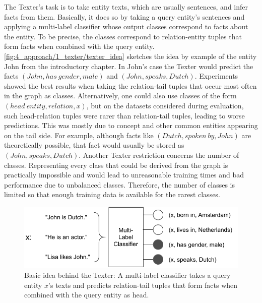 The Texter's task is to take entity texts, which are usually sentences, and infer facts from them. Basically, it does so by taking a query entity's sentences and applying a multi-label classifier whose output classes correspond to facts about the entity. To be precise, the classes correspond to relation-entity tuples that form facts when combined with the query entity. \autoref{fig:4_approach/1_texter/texter_idea} sketches the idea by example of the entity John from the introductory chapter. In John's case the Texter would predict the facts $(John, has~gender, male)$ and $(John, speaks, Dutch)$. Experiments showed the best results when taking the relation-tail tuples that occur most often in the graph as classes. Alternatively, one could also use classes of the form $(head~entity, relation, x)$, but on the datasets considered during evaluation, such head-relation tuples were rarer than relation-tail tuples, leading to worse predictions. This was mostly due to concept and other common entities appearing on the tail side. For example, although facts like $(Dutch, spoken~by, John)$ are theoretically possible, that fact would usually be stored as $(John, speaks, Dutch)$. Another Texter restriction concerns the number of classes. Representing every class that could be derived from the graph is practically impossible and would lead to unreasonable training times and bad performance due to unbalanced classes. Therefore, the number of classes is limited so that enough training data is available for the rarest classes.

\begin{figure}[t]
    \centering
    \includegraphics[width=\textwidth]{4_approach/1_texter/texter_idea}
    \caption{Basic idea behind the Texter: A multi-label classifier takes a query entity $x$'s texts and predicts relation-tail tuples that form facts when combined with the query entity as head.}
    \label{fig:4_approach/1_texter/texter_idea}
\end{figure}

